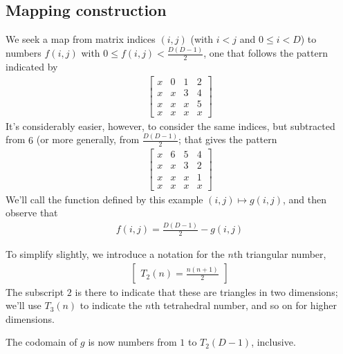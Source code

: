 \documentclass[11pt]{article}
\begin{document}
\subsection{Mapping construction}
We seek a map from matrix indices $(i, j)$ (with $i < j$ and $0 \le i < D$) to numbers $f(i, j)$ with $0 \le f(i, j) < \frac{D(D-1)}{2}$, one that follows the pattern indicated by 
\begin{align}
\begin{bmatrix}
x & 0 & 1 & 2 \\
x & x & 3 & 4 \\
x & x & x & 5 \\
x & x & x & x
\end{bmatrix}
\end{align}
It's considerably easier, however, to consider the same indices, but subtracted from $6$ (or more generally, from $\frac{D(D-1)}{2}$; that gives the pattern
\begin{align}
\label{eq:4x4mat}
\begin{bmatrix}
x & 6 & 5 & 4 \\
x & x & 3 & 2 \\
x & x & x & 1 \\
x & x & x & x
\end{bmatrix}
\end{align}
We'll call the function defined by this example $(i, j) \mapsto g(i, j)$, and then observe that 
\begin{align}
f(i, j) = \frac{D(D-1)}{2} - g(i, j)
\end{align}

To simplify slightly, we introduce a notation for the $n$th triangular number, 
\begin{align}
\begin{bmatrix}
T_2(n) = \frac{n(n+1)}{2}
\end{bmatrix}
\end{align}
\noindent
The subscript $2$ is there to indicate that these are triangles in two dimensions; we'll use $T_3(n)$ to indicate the $n$th tetrahedral number, and so on for higher dimensions. 

The codomain of $g$ is now numbers from $1$ to $T_2(D-1)$, inclusive. 
\end{document}

